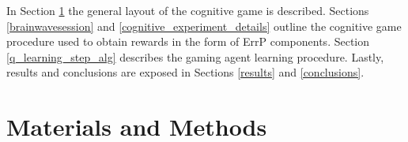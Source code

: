 \documentclass[journal]{IEEEtran}
\begin{document}
%



In Section \ref{section:materials} the general layout of the cognitive game is described. Sections \ref{brainwavesession} and \ref{cognitive_experiment_details} outline the cognitive game procedure used to obtain rewards in the form of ErrP components. Section \ref{q_learning_step_alg} describes the gaming agent learning procedure.  Lastly, results and conclusions are exposed in Sections \ref{results} and \ref{conclusions}.

\section{Materials and Methods}
\label{section:materials}
\end{document}

